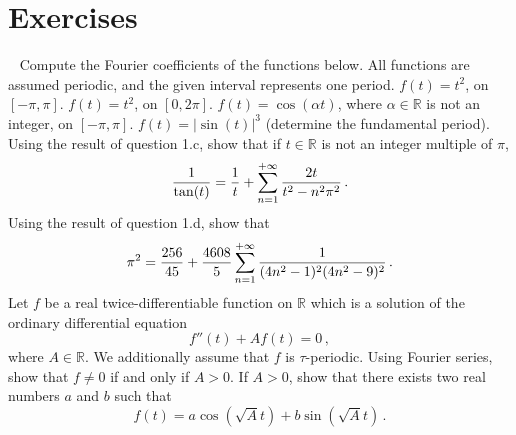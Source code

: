 \section{Exercises}
\begin{ExerciseList}
  \Exercise[label=seriesex]~
  \Question Compute the Fourier coefficients of the functions below. All functions are assumed periodic, and the given interval represents one period.
  \subQuestion $f(t)=t^2$, on $[-\pi,\pi]$.
  \subQuestion $f(t)=t^2$, on $[0,2\pi]$.
  \subQuestion $f(t)=\cos(\alpha t)$, where $\alpha\in\mathbb{R}$ is not an integer, on $[-\pi,\pi]$.
  \subQuestion $f(t)=|\sin(t)|^3$ (determine the fundamental period).
  \Question Using the result of question 1.c, show that if $t\in\mathbb{R}$ is not an integer multiple of $\pi$,
  \begin{equation}
    \frac{1}{\tan(t)}=\frac{1}{t}+\sum_{n=1}^{+\infty}\frac{2t}{t^2-n^2\pi^2}\,.\label{eq:cotan-sing}
  \end{equation}
  \Question Using the result of question 1.d, show that
  \begin{equation}
    \pi^2=\frac{256}{45}+\frac{4608}{5}\sum_{n=1}^{+\infty}\frac{1}{(4n^2-1)^2(4n^2-9)^2}\,.\label{eq:hard-pi2}
  \end{equation}
  \Exercise[label=fourierode2] Let $f$ be a real twice-differentiable function on $\mathbb{R}$ which is
  a solution of the ordinary differential equation
  \begin{equation}
    f''(t) + A f(t) = 0\,,
  \end{equation}
  where $A\in\mathbb{R}$. We additionally assume that $f$ is $\tau$-periodic.
  \Question Using Fourier series, show that $f\neq 0$ if and only if $A>0$.
  \Question If $A>0$, show that there exists two real numbers $a$ and $b$
  such that
  \begin{equation}
    f(t)=a\cos(\sqrt{A} t)+b\sin(\sqrt{A} t)\,.
  \end{equation}
\end{ExerciseList}
